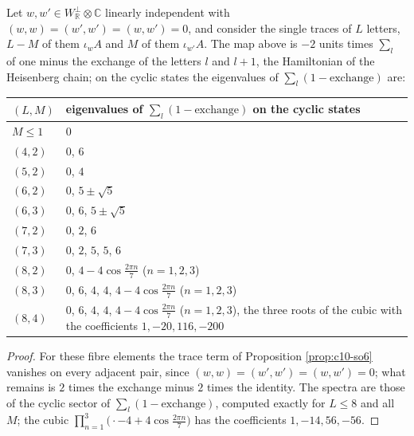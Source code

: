 \begin{proposition}
\label{prop:c10-su2}
Let $w,w'\in W_{\mathbb R}^\perp\otimes\mathbb C$ linearly independent with $(w,w)=(w',w')=(w,w')=0$, and consider the single traces of $L$ letters, $L-M$ of them $\iota_wA$ and $M$ of them $\iota_{w'}A$. The map above is $-2$ units times $\sum_l$ of one minus the exchange of the letters $l$ and $l+1$, the Hamiltonian of the Heisenberg chain; on the cyclic states the eigenvalues of $\sum_l(1-\text{exchange})$ are:

\begin{tabular}{l|l}
$(L,M)$ & eigenvalues of $\sum_l(1-\text{exchange})$ on the cyclic states\\
\hline
$M\le1$ & $0$\\
$(4,2)$ & $0$, $6$\\
$(5,2)$ & $0$, $4$\\
$(6,2)$ & $0$, $5\pm\sqrt5$\\
$(6,3)$ & $0$, $6$, $5\pm\sqrt5$\\
$(7,2)$ & $0$, $2$, $6$\\
$(7,3)$ & $0$, $2$, $5$, $5$, $6$\\
$(8,2)$ & $0$, $4-4\cos\frac{2\pi n}7$ ($n=1,2,3$)\\
$(8,3)$ & $0$, $6$, $4$, $4$, $4-4\cos\frac{2\pi n}7$ ($n=1,2,3$)\\
$(8,4)$ & $0$, $6$, $4$, $4$, $4-4\cos\frac{2\pi n}7$ ($n=1,2,3$), the three roots of the cubic with the coefficients $1,-20,116,-200$\\
\end{tabular}
\end{proposition}

\begin{proof}
For these fibre elements the trace term of Proposition \ref{prop:c10-so6} vanishes on every adjacent pair, since $(w,w)=(w',w')=(w,w')=0$; what remains is $2$ times the exchange minus $2$ times the identity. The spectra are those of the cyclic sector of $\sum_l(1-\text{exchange})$, computed exactly for $L\le8$ and all $M$; the cubic $\prod_{n=1}^3\big(\cdot-4+4\cos\frac{2\pi n}7\big)$ has the coefficients $1,-14,56,-56$.
\end{proof}

